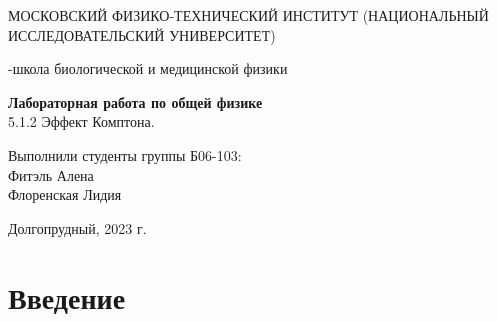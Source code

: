 \documentclass[a4paper,12pt]{article}
\begin{document}
\def\figurename{Рисунок}
\begin{titlepage}
\begin{center}
    {\large МОСКОВСКИЙ ФИЗИКО-ТЕХНИЧЕСКИЙ ИНСТИТУТ (НАЦИОНАЛЬНЫЙ ИССЛЕДОВАТЕЛЬСКИЙ УНИВЕРСИТЕТ)}
\end{center}
\begin{center}
    {-школа биологической и медицинской физики}
\end{center}

\vspace{1cm}
{\huge
\begin{center}
    {\bf Лабораторная работа по общей физике}\\
    \vspace{0.5cm}
    5.1.2 Эффект Комптона.
\end{center}
}

\vspace{4cm}
\begin{flushright}
{\LARGE Выполнили студенты группы Б06-103:\\ Фитэль Алена \\Флоренская Лидия\\}

\end{flushright}
\vspace{9cm}
\begin{center}
    Долгопрудный, 2023 г.
\end{center}
\end{titlepage}


\newpage
\section{Введение}
\end{document}

